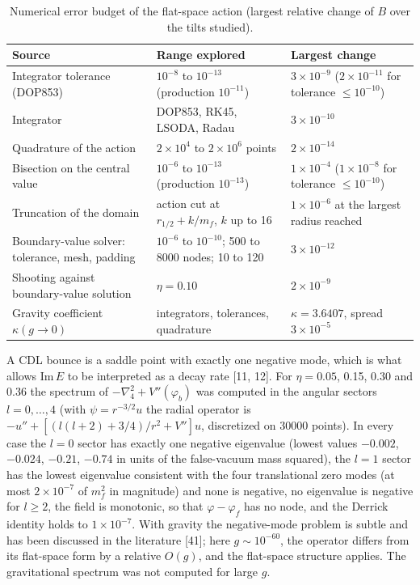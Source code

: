 \documentclass[11pt,a4paper]{article}
\begin{document}
\begin{table}[htbp]\centering\small
\caption{Numerical error budget of the flat-space action (largest relative change of $B$ over the tilts studied).}
\begin{tabular}{>{\raggedright\arraybackslash}p{0.346\dimexpr\textwidth-6\tabcolsep\relax}>{\raggedright\arraybackslash}p{0.316\dimexpr\textwidth-6\tabcolsep\relax}>{\raggedright\arraybackslash}p{0.338\dimexpr\textwidth-6\tabcolsep\relax}}
\toprule
Source & Range explored & Largest change \\ \midrule
Integrator tolerance (DOP853) & $10^{-8}$ to $10^{-13}$ (production $10^{-11}$) & $3\times10^{-9}$ ($2\times10^{-11}$ for tolerance $\le10^{-10}$) \\
Integrator & DOP853, RK45, LSODA, Radau & $3\times10^{-10}$ \\
Quadrature of the action & $2\times10^4$ to $2\times10^6$ points & $2\times10^{-14}$ \\
Bisection on the central value & $10^{-6}$ to $10^{-13}$ (production $10^{-13}$) & $1\times10^{-4}$ ($1\times10^{-8}$ for tolerance $\le10^{-10}$) \\
Truncation of the domain & action cut at $r_{1/2}+k/m_f$, $k$ up to 16 & $1\times10^{-6}$ at the largest radius reached \\
Boundary-value solver: tolerance, mesh, padding & $10^{-6}$ to $10^{-10}$; 500 to 8000 nodes; 10 to 120 & $3\times10^{-12}$ \\
Shooting against boundary-value solution & $\eta=0.10$ & $2\times10^{-9}$ \\
Gravity coefficient $\kappa(g\to0)$ & integrators, tolerances, quadrature & $\kappa=3.6407$, spread $3\times10^{-5}$ \\
\bottomrule
\end{tabular}
\end{table}
A CDL bounce is a saddle point with exactly one negative mode, which is what allows $\mathrm{Im}\,E$ to be interpreted as a decay rate [11, 12]. For $\eta=0.05$, 0.15, 0.30 and 0.36 the spectrum of $-\nabla_4^2+V''(\varphi_b)$ was computed in the angular sectors $l=0,\dots,4$ (with $\psi=r^{-3/2}u$ the radial operator is $-u''+[(l(l+2)+3/4)/r^2+V'']u$, discretized on 30000 points). In every case the $l=0$ sector has exactly one negative eigenvalue (lowest values $-0.002$, $-0.024$, $-0.21$, $-0.74$ in units of the false-vacuum mass squared), the $l=1$ sector has the lowest eigenvalue consistent with the four translational zero modes (at most $2\times10^{-7}$ of $m_f^2$ in magnitude) and none is negative, no eigenvalue is negative for $l\ge2$, the field is monotonic, so that $\varphi-\varphi_f$ has no node, and the Derrick identity holds to $1\times10^{-7}$. With gravity the negative-mode problem is subtle and has been discussed in the literature [41]; here $g\sim10^{-60}$, the operator differs from its flat-space form by a relative $O(g)$, and the flat-space structure applies. The gravitational spectrum was not computed for large $g$.
\end{document}
